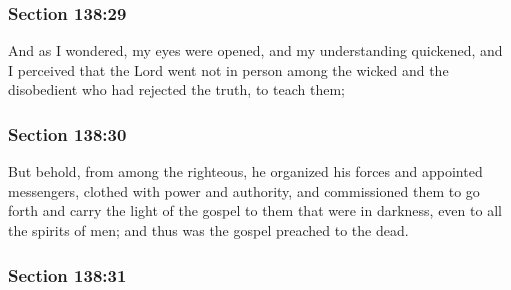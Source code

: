 
	\subsubsection{Section 138:29} %
		\label{DC138-29}

		And as I wondered, my eyes were opened, and my understanding quickened, and I perceived that the Lord went not in person among the wicked and the disobedient who had rejected the truth, to teach them;


	\subsubsection{Section 138:30} %
		\label{DC138-30}

		But behold, from among the righteous, he organized his forces and appointed messengers, clothed with power and authority, and commissioned them to go forth and carry the light of the gospel to them that were in darkness, even to all the spirits of men; and thus was the gospel preached to the dead.


	\subsubsection{Section 138:31} %
		\label{DC138-31}

